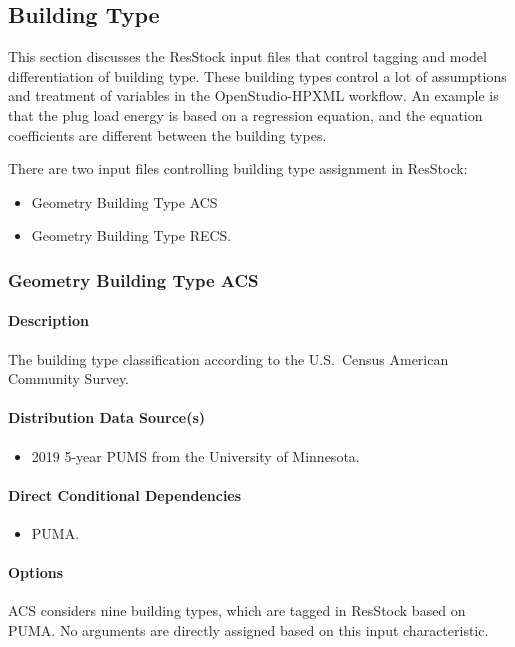 \subsection{Building Type}
This section discusses the ResStock input files that control tagging and model differentiation of building type.  These building types control a lot of assumptions and treatment of variables in the OpenStudio-HPXML workflow. An example is that the plug load energy is based on a regression equation, and the equation coefficients are different between the building types.

There are two input files controlling building type assignment in ResStock:

\begin{itemize}
    \item Geometry Building Type ACS
    \item Geometry Building Type RECS.
\end{itemize}

\subsubsection{Geometry Building Type ACS}
\paragraph{Description}
The building type classification according to the U.S.~Census American Community Survey.

\paragraph{Distribution Data Source(s)}
\begin{itemize}
    \item 2019 5-year PUMS from the University of Minnesota.
\end{itemize}

\paragraph{Direct Conditional Dependencies}
\begin{itemize}
    \item PUMA.
\end{itemize}
\paragraph{Options}
ACS considers nine building types, which are tagged in ResStock based on PUMA. No arguments are directly assigned based on this input characteristic.

